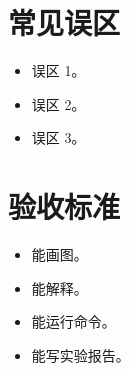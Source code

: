 \section{常见误区}

\begin{warningbox}
\begin{itemize}
  \item 误区 1。
  \item 误区 2。
  \item 误区 3。
\end{itemize}
\end{warningbox}

\section{验收标准}

\begin{itemize}
  \item 能画图。
  \item 能解释。
  \item 能运行命令。
  \item 能写实验报告。
\end{itemize}

